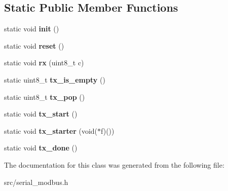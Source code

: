 \subsection*{Static Public Member Functions}
\begin{DoxyCompactItemize}
\item 
\hypertarget{classSerialModbus_ad8f96c1efa89ccbb10186b9b77ea2bc1}{}\label{classSerialModbus_ad8f96c1efa89ccbb10186b9b77ea2bc1} 
static void {\bfseries init} ()
\item 
\hypertarget{classSerialModbus_a0ae598204577db1fd82e68d2b41930b8}{}\label{classSerialModbus_a0ae598204577db1fd82e68d2b41930b8} 
static void {\bfseries reset} ()
\item 
\hypertarget{classSerialModbus_a9926866e6d3f6149d0114b5a451c0d0d}{}\label{classSerialModbus_a9926866e6d3f6149d0114b5a451c0d0d} 
static void {\bfseries rx} (uint8\+\_\+t c)
\item 
\hypertarget{classSerialModbus_a40a4049b9d9d1a544527d6fa00368d4b}{}\label{classSerialModbus_a40a4049b9d9d1a544527d6fa00368d4b} 
static uint8\+\_\+t {\bfseries tx\+\_\+is\+\_\+empty} ()
\item 
\hypertarget{classSerialModbus_ad54e0c898019b1a054d5e16545dfd77e}{}\label{classSerialModbus_ad54e0c898019b1a054d5e16545dfd77e} 
static uint8\+\_\+t {\bfseries tx\+\_\+pop} ()
\item 
\hypertarget{classSerialModbus_a1a357b1926059d1a5de9f67d0dfbc58d}{}\label{classSerialModbus_a1a357b1926059d1a5de9f67d0dfbc58d} 
static void {\bfseries tx\+\_\+start} ()
\item 
\hypertarget{classSerialModbus_aea9b2c09800c4a2abf06c8451ba10694}{}\label{classSerialModbus_aea9b2c09800c4a2abf06c8451ba10694} 
static void {\bfseries tx\+\_\+starter} (void($\ast$f)())
\item 
\hypertarget{classSerialModbus_a3734d117de4c94df22bbbe09d4e5782d}{}\label{classSerialModbus_a3734d117de4c94df22bbbe09d4e5782d} 
static void {\bfseries tx\+\_\+done} ()
\end{DoxyCompactItemize}


The documentation for this class was generated from the following file\+:\begin{DoxyCompactItemize}
\item 
src/serial\+\_\+modbus.\+h\end{DoxyCompactItemize}
